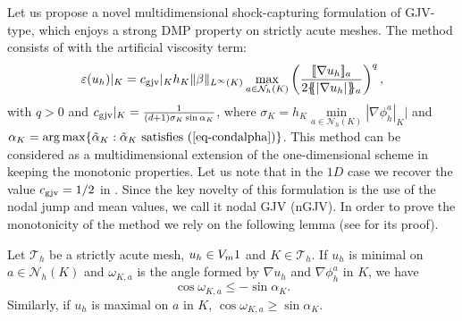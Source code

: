 Let us propose a novel multidimensional shock-capturing formulation of GJV-type, which enjoys a strong DMP property on strictly
acute meshes. The method consists of  with  the artificial viscosity term:
\begin{align}\label{eq-gjvisc0}
\varepsilon(u_h)|_K = c_{\rm gjv}|_K h_K \|\beta\|_{L^\infty(K)} \max_{a \in \mathcal{N}_h(K)}\left(\frac{ \lbrack\!\lbrack \nabla u_h \rbrack\!\rbrack_a }{2\{\! \!\{ |\nabla u_h|\}\! \!\}_a}\right)^q,
\end{align}
with $q>0$ and $c_{\rm gjv}|_K = \frac{1}{(d+1)\sigma_K \sin \alpha_K}$, where $\sigma_K = h_K \min\limits_{a \in \mathcal{N}_h(K)} |\nabla\phi^a_h|_K|$ and $\alpha_K = {\rm arg} \max \{ \tilde \alpha_K:  \tilde \alpha_K \hbox{ satisfies \Eq{condalpha}}\}$. This method can be considered as a multidimensional extension of the one-dimensional scheme in \cite{burman_nonlinear_2007} keeping the monotonic properties.  Let us note that in the $1D$ case we recover the value $c_{\rm gjv} = 1/2$ in \cite{burman_nonlinear_2007}. Since the key novelty of this formulation is the use of the nodal jump and mean values, we call it nodal GJV (nGJV). 
In order to prove the monotonicity of the method we rely on the following lemma (see \cite{burman_nonlinear_2002} for its proof).
\begin{lemma}\label{lem-stracute}
Let $\mathcal{T}_h$ be a strictly acute mesh, $u_h\in V_m1$ and $K\in\mathcal{T}_h$. If $u_h$ is minimal on $a \in \mathcal{N}_h(K)$ and $\omega_{K,a}$ is the angle formed by $\nabla u_h$ and $\nabla \phi_h^a$ in $K$, we have
$$\cos \omega_{K,a} \leq - \sin \alpha_K.$$
Similarly, if $u_h$ is maximal on $a$ in $K$, $\cos \omega_{K,a} \geq  \sin \alpha_K$.
\end{lemma}

